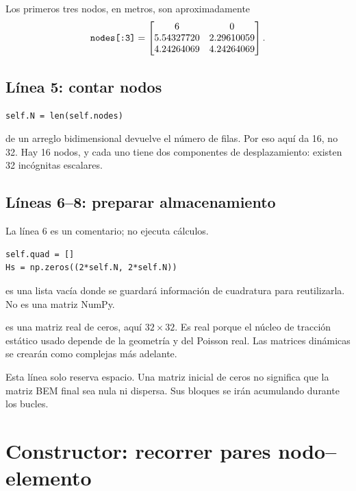 \documentclass[11pt,a4paper]{article}
\numberwithin{equation}{section}
\DeclareRobustCommand{\code}[1]{\texttt{\detokenize{#1}}}
\begin{document}
Los primeros tres nodos, en metros, son aproximadamente
\begin{equation}
 \code{nodes[:3]}=
 \begin{bmatrix}
 6&0\\
 5.54327720&2.29610059\\
 4.24264069&4.24264069
 \end{bmatrix}.
\end{equation}

\subsection{L\'inea 5: contar nodos}
\begin{lstlisting}
self.N = len(self.nodes)
\end{lstlisting}
\code{len} de un arreglo bidimensional devuelve el n\'umero de filas.
Por eso aqu\'i da 16, no 32. Hay 16 nodos, y cada uno tiene
dos componentes de desplazamiento: existen 32 inc\'ognitas escalares.

\subsection{L\'ineas 6--8: preparar almacenamiento}
La l\'inea 6 es un comentario; no ejecuta c\'alculos.
\begin{lstlisting}
self.quad = []
Hs = np.zeros((2*self.N, 2*self.N))
\end{lstlisting}
\code{self.quad} es una lista vac\'ia donde se guardar\'a informaci\'on
de cuadratura para reutilizarla. No es una matriz NumPy.

\code{Hs} es una matriz real de ceros, aqu\'i $32\times32$.
Es real porque el n\'ucleo de tracci\'on est\'atico usado depende de
la geometr\'ia y del Poisson real. Las matrices din\'amicas se
crear\'an como complejas m\'as adelante.

\begin{idea}
Esta l\'inea solo reserva espacio. Una matriz inicial de ceros no
significa que la matriz BEM final sea nula ni dispersa.
Sus bloques se ir\'an acumulando durante los bucles.
\end{idea}

\section{Constructor: recorrer pares nodo--elemento}
\end{document}
